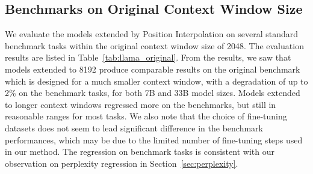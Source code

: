 \documentclass{article} %
\theoremstyle{definition}
\newcommand{\ignore}[1]{}
\begin{document}
\subsection{Benchmarks on Original Context Window Size}
\label{sec:llama}

We evaluate the models extended by Position Interpolation on several standard benchmark tasks within the original context window size of 2048.
The evaluation results are listed in Table~\ref{tab:llama_original}.
From the results, we saw that models extended to 8192 produce comparable results on 
the original benchmark which is designed for a much smaller context window, with
a degradation of up to 2\% on the benchmark tasks, for both 7B and 33B model sizes. 
Models extended to longer context windows regressed more on the benchmarks, but still in reasonable ranges for most tasks. 
We also note that the choice of fine-tuning datasets does not seem to lead significant difference in the
benchmark performances, which may be due to the limited number of fine-tuning steps used in our method.
The regression on benchmark tasks is consistent with our observation on perplexity regression in Section~\ref{sec:perplexity}.

\ignore{
There are two sources w.r.t performance degradation: 
\begin{enumerate}
\item Performance regression while aligning to specific fine-tuning dataset, this is also observed in \cite{ouyang2022training} which can be mitigated by ``rehearsing" on pre-trained dataset during finetuning. As shown in Table~\ref{tab:llama_original}, we observe
less regression when fine-tuning on Redpajama dataset which is more aligned with orignal LLaMA training set. We notice the 
performance degradation worsened when extending to longer context windows. 

\item Performance regression due to position interpolation. This is the price we pay due to loss of language model's ``resolution". We observed worse benchmark results when interpolating (extending to) longer context windows -- this is also observed in Passkey Retrieval task where we see the retrieval accuracy degrading as we extend to longer window size.

\end{enumerate}
}
\end{document}
